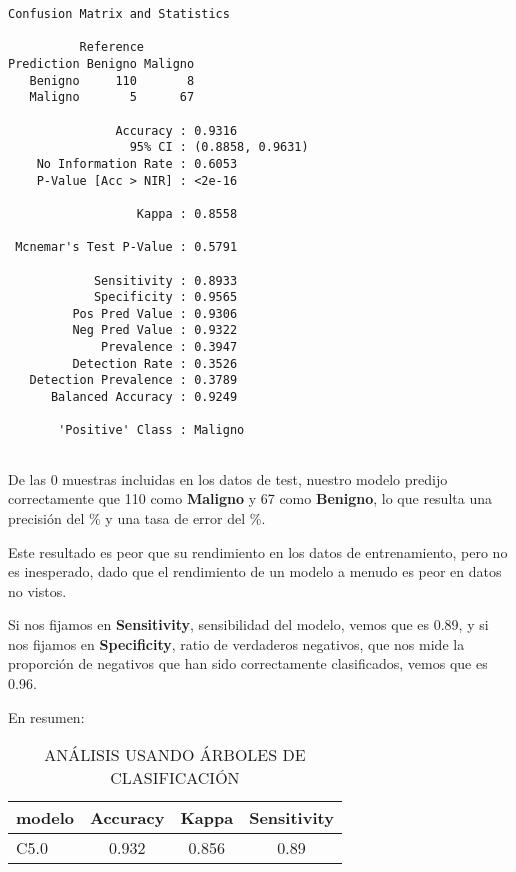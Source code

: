 \documentclass[
]{article}
\begin{document}
\begin{verbatim}
Confusion Matrix and Statistics

          Reference
Prediction Benigno Maligno
   Benigno     110       8
   Maligno       5      67
                                          
               Accuracy : 0.9316          
                 95% CI : (0.8858, 0.9631)
    No Information Rate : 0.6053          
    P-Value [Acc > NIR] : <2e-16          
                                          
                  Kappa : 0.8558          
                                          
 Mcnemar's Test P-Value : 0.5791          
                                          
            Sensitivity : 0.8933          
            Specificity : 0.9565          
         Pos Pred Value : 0.9306          
         Neg Pred Value : 0.9322          
             Prevalence : 0.3947          
         Detection Rate : 0.3526          
   Detection Prevalence : 0.3789          
      Balanced Accuracy : 0.9249          
                                          
       'Positive' Class : Maligno         
                                          
\end{verbatim}

De las 0 muestras incluidas en los datos de test, nuestro modelo predijo
correctamente que 110 como \textbf{Maligno} y 67 como \textbf{Benigno},
lo que resulta una precisión del \% y una tasa de error del \%.

Este resultado es peor que su rendimiento en los datos de entrenamiento,
pero no es inesperado, dado que el rendimiento de un modelo a menudo es
peor en datos no vistos.

Si nos fijamos en \textbf{Sensitivity}, sensibilidad del modelo, vemos
que es 0.89, y si nos fijamos en \textbf{Specificity}, ratio de
verdaderos negativos, que nos mide la proporción de negativos que han
sido correctamente clasificados, vemos que es 0.96.

En resumen:

\begin{table}

\caption{\label{tab:unnamed-chunk-59}ANÁLISIS USANDO ÁRBOLES DE CLASIFICACIÓN}
\centering
\begin{tabular}[t]{l|c|c|c}
\hline
modelo & Accuracy & Kappa & Sensitivity\\
\hline
C5.0 & 0.932 & 0.856 & 0.89\\
\hline
\end{tabular}
\end{table}
\end{document}
